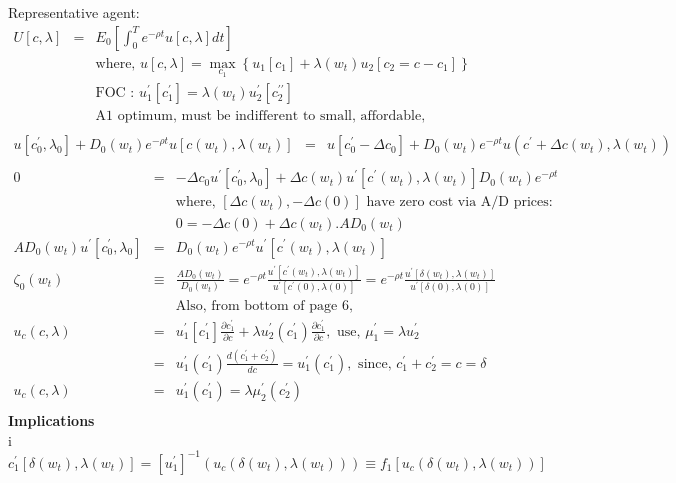 \documentclass[]{article}
\begin{document}
Representative agent:
\begin{eqnarray*}
U[c,\lambda] &=& E_0\left[\int_0^T e^{-\rho t} u[c, \lambda] dt\right]\\
&&\mbox{where, } u[c,\lambda] = \max_{c_1} \left\{u_1[c_1] + \lambda(w_t) u_2[c_2 = c-c_1]\right\}\\
&& \mbox{FOC : } u_1^\prime[c_1^\prime] = \lambda(w_t) u_2^\prime[c_2^{\prime\prime}]\\
&&\mbox{A1 optimum, must be indifferent to small, affordable, consumption changes}\\
\end{eqnarray*}
\begin{eqnarray*}
u[c_0^\prime, \lambda_0] + D_0(w_t) e^{-\rho t} u[c(w_t), \lambda(w_t)] &=& u[c_0^\prime - \Delta c_0] + 
D_0(w_t)e^{-\rho t} u(c^\prime + \Delta c(w_t), \lambda(w_t))\\
\end{eqnarray*}
\begin{eqnarray*}
0&=&-\Delta c_0 u^\prime[c_0^\prime, \lambda_0] + \Delta c(w_t)u^\prime[c^\prime (w_t), \lambda(w_t)]D_0(w_t)e^{-\rho t}\\
&&\mbox{where, $[\Delta c(w_t), -\Delta c(0)]$ have zero cost via A/D prices:}\\
&&0=-\Delta c(0) + \Delta c(w_t) . AD_0 (w_t)\\
AD_0(w_t) u^\prime[c_0^\prime, \lambda_0] &=& D_0(w_t)e^{-\rho t} u^\prime [c^\prime(w_t), \lambda(w_t)]\\
\zeta_0(w_t) &\equiv & \frac{AD_0(w_t)}{D_0(w_t)} = e^{-\rho t} \frac{u^\prime [c^\prime(w_t), \lambda (w_t)]}{u^\prime [c^\prime(0), \lambda(0)]} = e^{-\rho t} \frac{u^\prime [\delta(w_t), \lambda (w_t)]}{u^\prime [\delta(0), \lambda(0)]}\\
&&\mbox{Also, from bottom of page 6,}\\
u_c(c,\lambda) &=& u_1^\prime [c_1^\prime]\frac{\partial c_1^\prime}{\partial c} + \lambda u_2^\prime(c_1^\prime) \frac{\partial c_1^\prime}{\partial c}, \mbox{  use, } \mu_1^\prime = \lambda u_2^\prime\\
&=& u_1^\prime (c_1^\prime) \frac{d(c_1^\prime + c_2^\prime)}{dc} = u_1^\prime (c_1^\prime), \mbox{  since, } c_1^\prime + c_2^\prime = c = \delta\\
u_c(c,\lambda) &=& u_1^\prime(c_1^\prime) = \lambda \mu_2^\prime(c_2^\prime)\\
\end{eqnarray*}
\textbf{Implications}\\
i
\begin{equation}
c_1^\prime [\delta(w_t), \lambda (w_t)] = \left[u_1^\prime\right]^{-1} (u_c(\delta(w_t), \lambda(w_t))) \equiv f_1[u_c(\delta(w_t), \lambda(w_t))]\tag{18}
\end{equation}
\end{document}
